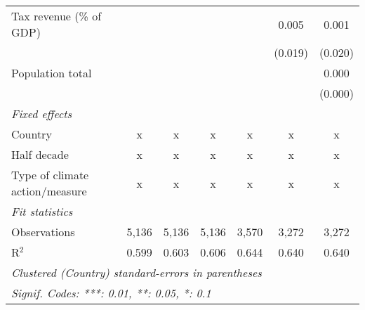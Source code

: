 \begin{tabular}{lcccccc}
   Tax revenue (\% of GDP)                                                                            &               &                &                &                & 0.005          & 0.001\\   
                                                                                                      &               &                &                &                & (0.019)        & (0.020)\\   
   Population total                                                                                   &               &                &                &                &                & 0.000\\   
                                                                                                      &               &                &                &                &                & (0.000)\\   
   \emph{Fixed effects}\\
   Country                                                                                            & x             & x              & x              & x              & x              & x\\  
   Half decade                                                                                        & x             & x              & x              & x              & x              & x\\  
   Type of climate action/measure                                                                     & x             & x              & x              & x              & x              & x\\  
   \midrule \emph{Fit statistics}\\
   Observations                                                                                       & 5,136         & 5,136          & 5,136          & 3,570          & 3,272          & 3,272\\  
   R$^2$                                                                                              & 0.599         & 0.603          & 0.606          & 0.644          & 0.640          & 0.640\\  
   \midrule
   \multicolumn{7}{l}{\emph{Clustered (Country) standard-errors in parentheses}}\\
   \multicolumn{7}{l}{\emph{Signif. Codes: ***: 0.01, **: 0.05, *: 0.1}}\\
\end{tabular}
\par\endgroup


